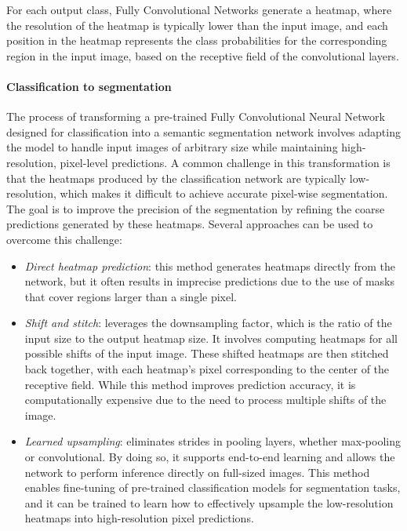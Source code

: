 For each output class, Fully Convolutional Networks generate a heatmap, where the resolution of the heatmap is typically lower than the input image, and each position in the heatmap represents the class probabilities for the corresponding region in the input image, based on the receptive field of the convolutional layers.

\paragraph*{Classification to segmentation}
The process of transforming a pre-trained Fully Convolutional Neural Network designed for classification into a semantic segmentation network involves adapting the model to handle input images of arbitrary size while maintaining high-resolution, pixel-level predictions.
A common challenge in this transformation is that the heatmaps produced by the classification network are typically low-resolution, which makes it difficult to achieve accurate pixel-wise segmentation. 
The goal is to improve the precision of the segmentation by refining the coarse predictions generated by these heatmaps.
Several approaches can be used to overcome this challenge:
\begin{itemize}
    \item \textit{Direct heatmap prediction}: this method generates heatmaps directly from the network, but it often results in imprecise predictions due to the use of masks that cover regions larger than a single pixel.
    \item \textit{Shift and stitch}: leverages the downsampling factor, which is the ratio of the input size to the output heatmap size. 
        It involves computing heatmaps for all possible shifts of the input image. These shifted heatmaps are then stitched back together, with each heatmap's pixel corresponding to the center of the receptive field. 
        While this method improves prediction accuracy, it is computationally expensive due to the need to process multiple shifts of the image.
    \item \textit{Learned upsampling}: eliminates strides in pooling layers, whether max-pooling or convolutional. 
        By doing so, it supports end-to-end learning and allows the network to perform inference directly on full-sized images.
        This method enables fine-tuning of pre-trained classification models for segmentation tasks, and it can be trained to learn how to effectively upsample the low-resolution heatmaps into high-resolution pixel predictions.
\end{itemize}

